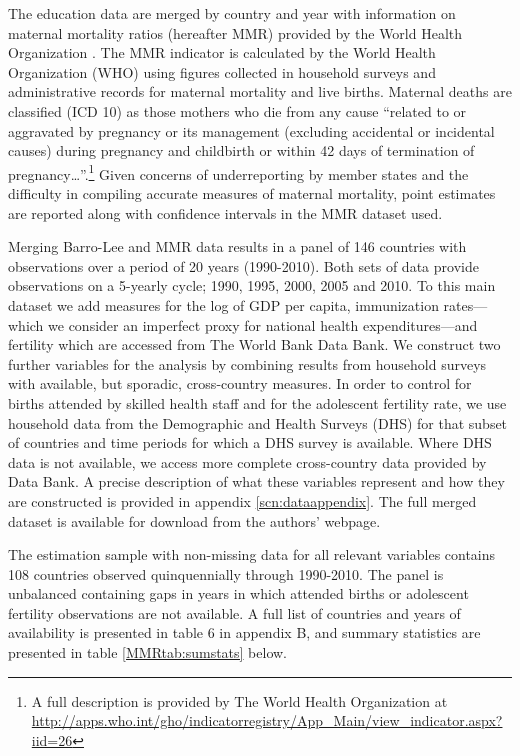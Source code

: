 \documentclass{article}[12pt,subeqn]
\begin{document}
\begin{spacing}{1.4}
The education data are merged by country and year with information on maternal mortality ratios (hereafter MMR) provided by the 
World Health Organization \citep{WHO2012}. The MMR indicator is calculated by the World Health Organization 
(WHO) using figures collected in household surveys and administrative records for maternal mortality and live births. Maternal 
deaths are classified (ICD 10) as those mothers who die from any cause ``related to or aggravated by pregnancy or its management 
(excluding accidental or incidental causes) during pregnancy and childbirth or within 42 days of termination of pregnancy\ldots''.\footnote{A 
full description is provided by The World Health Organization at \url{http://apps.who.int/gho/indicatorregistry/App_Main/view_indicator.aspx?iid=26}} 
Given concerns of underreporting by member states and the difficulty in compiling accurate measures of maternal mortality, 
point estimates are reported along with confidence intervals in the MMR dataset used.

Merging Barro-Lee and MMR data results in a panel of 146 countries with observations over a period of 20
years (1990-2010). Both sets of data provide observations on a 5-yearly cycle; 1990, 1995, 2000, 2005 and
2010. To this main dataset we add measures for the log of GDP per capita, immunization rates—which we
consider an imperfect proxy for national health expenditures—and fertility which are accessed from The
World Bank Data Bank. We construct two further variables for the analysis by combining results from
household surveys with available, but sporadic, cross-country measures. In order to control for births
attended by skilled health staff and for the adolescent fertility rate, we use household data from the
Demographic and Health Surveys (DHS) for that subset of countries and time periods for which a DHS
survey is available. Where DHS data is not available, we access more complete cross-country data provided
by \citet{WorldBank2012} Data Bank. A precise description of what these variables represent and how they are
constructed is provided in appendix \ref{scn:dataappendix}.  The full merged dataset is available for
download from the authors' webpage.

The estimation sample with non-missing data for all relevant variables contains 108 countries observed
quinquennially through 1990-2010. The panel is unbalanced containing gaps in years in which attended
births or adolescent fertility observations are not available. A full list of countries and years of availability is
presented in table 6 in appendix B, and summary statistics are presented in table \ref{MMRtab:sumstats} below.


\end{spacing}
\end{document}

